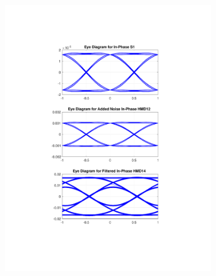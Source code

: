 \begin{figure}[H]
	\centering
	\begin{subfigure}{.45\textwidth}
		\centering
		\includegraphics[clip, trim=5cm 4cm 5cm 4cm, width=\textwidth]{./sdf/m_qam_system/figures/eyes/if_nn_p_60_09_rc.pdf}
	\end{subfigure}
	\begin{subfigure}{.45\textwidth}
		\centering

\end{subfigure}
\end{figure}

